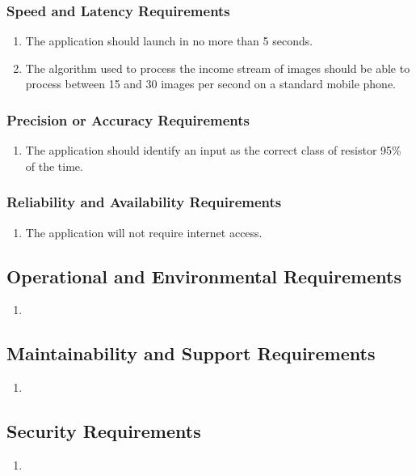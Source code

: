 \documentclass{article}
\begin{document}
\subsubsection{Speed and Latency Requirements}
\begin{enumerate}
\item The application should launch in no more than 5 seconds.
\item The algorithm used to process the income stream of images should be able to process between 15 and 30 images per second on a standard mobile phone.
\end{enumerate}
\subsubsection{Precision or Accuracy Requirements}
\begin{enumerate}
\item The application should identify an input as the correct class of resistor 95\% of the time.
\end{enumerate}
\subsubsection{Reliability and Availability Requirements}
\begin{enumerate}
\item The application will not require internet access.
\end{enumerate}
\subsection{Operational and Environmental Requirements}
\begin{enumerate}
\item
\end{enumerate}
\subsection{Maintainability and Support Requirements}
\begin{enumerate}
\item
\end{enumerate}
\subsection{Security Requirements}
\begin{enumerate}
\item
\end{enumerate}
\end{document}
